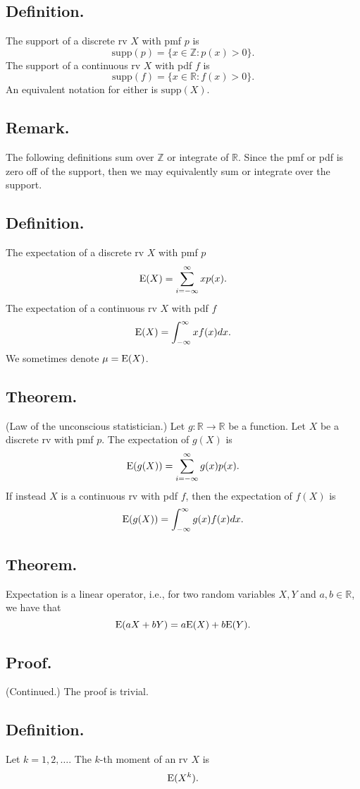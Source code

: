 \documentclass[titlepage]{article}
\begin{document}
\subsection{Definition.} The support of a discrete rv $X$ with pmf $p$ is  
$$\text{supp}(p) = \{x \in \mathbb{Z} : p(x) > 0\}.$$
The support of a continuous rv $X$ with pdf $f$ is
$$\text{supp}(f) = \{x \in \mathbb{R} : f(x) > 0\}.$$
An equivalent notation for either is $\text{supp}(X)$.

\subsection{Remark.} The following definitions sum over $\mathbb{Z}$ or integrate of $\mathbb{R}$. Since the pmf or pdf is zero off of the support, then we may equivalently sum or integrate over the support.

\subsection{Definition.} The expectation of a discrete rv $X$ with pmf $p$
$$\text{E}(X) = \sum_{i=-\infty}^{\infty}xp(x).$$
The expectation of a continuous rv $X$ with pdf $f$
$$\text{E}(X) = \int_{-\infty}^{\infty}xf(x)dx.$$
We sometimes denote $\mu = \text{E}(X)$.

\subsection{Theorem.} (Law of the unconscious statistician.) Let $g: \mathbb{R} \to \mathbb{R}$ be a function. Let $X$ be a discrete rv with pmf $p$. The expectation of $g(X)$ is 
$$\text{E}(g(X)) = \sum_{i=-\infty}^{\infty}g(x)p(x).$$
If instead $X$ is a continuous rv with pdf $f$, then the expectation of $f(X)$ is
$$\text{E}(g(X)) = \int_{-\infty}^{\infty}g(x)f(x)dx.$$

\subsection{Theorem.} Expectation is a linear operator, i.e., for two random variables $X, Y$ and $a, b \in \mathbb{R}$, we have that 
$$\text{E}(aX + bY) = a\text{E}(X) + b\text{E}(Y).$$

\subsection{Proof.} (Continued.) The proof is trivial.

\subsection{Definition.} Let $k = 1, 2, \ldots$. The $k$-th moment of an rv $X$ is 
$$\text{E}(X^{k}).$$
\end{document}
